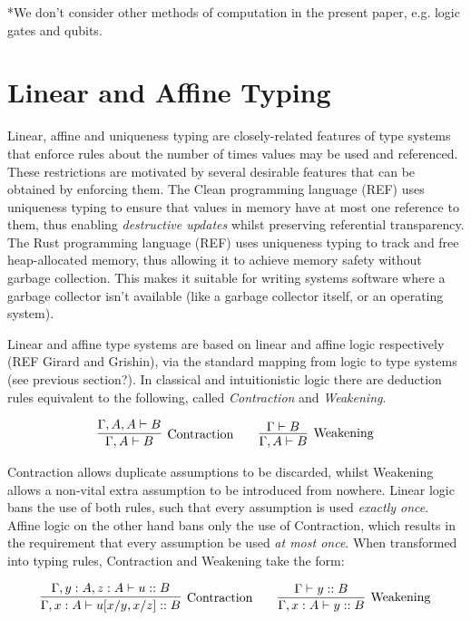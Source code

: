 \documentclass[]{unswthesis}
\begin{document}
*We don't consider other methods of computation in the present paper, e.g. logic gates and qubits.

\section{Linear and Affine Typing}

Linear, affine and uniqueness typing are closely-related features of type systems that enforce rules about the number of times values may be used and referenced. These restrictions are motivated by several desirable features that can be obtained by enforcing them. The Clean programming language (REF) uses uniqueness typing to ensure that values in memory have at most one reference to them, thus enabling \textit{destructive updates} whilst preserving referential transparency. The Rust programming language (REF) uses uniqueness typing to track and free heap-allocated memory, thus allowing it to achieve memory safety without garbage collection. This makes it suitable for writing systems software where a garbage collector isn't available (like a garbage collector itself, or an operating system).

Linear and affine type systems are based on linear and affine logic respectively (REF Girard and Grishin), via the standard mapping from logic to type systems (see previous section?). In classical and intuitionistic logic there are deduction rules equivalent to the following, called \textit{Contraction} and \textit{Weakening}.

\begin{eqnarray*}
\infer[\text{Contraction}]{\Gamma, A \vdash B}{
	\Gamma, A, A \vdash B
}
\qquad
\infer[\text{Weakening}]{\Gamma, A \vdash B}{
    \Gamma \vdash B
}
\end{eqnarray*}

Contraction allows duplicate assumptions to be discarded, whilst Weakening allows a non-vital extra assumption to be introduced from nowhere. Linear logic bans the use of both rules, such that every assumption is used \textit{exactly once}. Affine logic on the other hand bans only the use of Contraction, which results in the requirement that every assumption be used \textit{at most once}. When transformed into typing rules, Contraction and Weakening take the form:

\begin{eqnarray*}
\infer[\text{Contraction}]{\Gamma, x : A \vdash u[x/y, x/z] :: B}{
	\Gamma, y : A, z : A \vdash u :: B
}
\qquad
\infer[\text{Weakening}]{\Gamma, x : A \vdash y :: B}{
    \Gamma\vdash y :: B
}
\end{eqnarray*}
\end{document}
